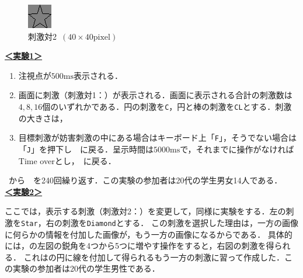 \begin{figure}
\begin{minipage}[t]{.13\textwidth}
        \includegraphics[keepaspectratio,width=\textwidth]{../../13_BehavioralExperiment/star.png}
    \end{minipage}
    \caption{刺激対2\ \((40\times 40\textrm{pixel})\)}
    \label{fig:刺激対2}
    \vspace{-1cm}
\end{figure}
\noindent\textbf{\underline{＜実験1＞}}
\begin{enumerate}
    \renewcommand{\labelenumi}{\fbox{\theenumi}}
    \item 注視点が\(500\textrm{ms}\)表示される．
    \item 画面に刺激（刺激対1：）が表示される．画面に表示される合計の刺激数は\(4,8,16\)個のいずれかである．円の刺激を\texttt{C}，円と棒の刺激を\texttt{CL}とする．刺激の大きさは，
    \item 目標刺激が妨害刺激の中にある場合はキーボード上「\texttt{F}」，そうでない場合は「\texttt{J}」を押下し\ \ に戻る．呈示時間は\(5000\textrm{ms}\)で，それまでに操作がなければTime overとし，\ に戻る．
\end{enumerate}
\ から\ \ を240回繰り返す．この実験の参加者は20代の学生男女14人である．\\
\textbf{\underline{＜実験2＞}}\par
ここでは，表示する刺激（刺激対2：）を変更して，同様に実験をする．左の刺激を\texttt{Star}，右の刺激を\texttt{Diamond}とする．
この刺激を選択した理由は，一方の画像に何らかの情報を付加した画像が，もう一方の画像になるからである．
具体的には，の左図の鋭角を4つから5つに増やす操作をすると，右図の刺激を得られる．
これはの円に線を付加して得られるもう一方の刺激に習って作成した．この実験の参加者は20代の学生男性である．
